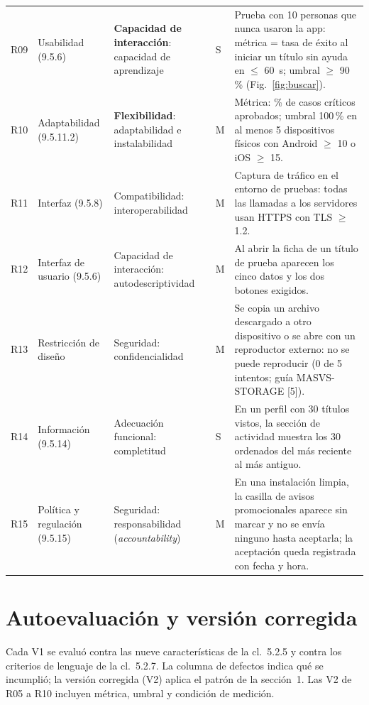 \documentclass[11pt,a4paper]{article}
\newcommand{\cl}[1]{cl.~#1}
\begin{document}
\begin{longtable}{@{}p{0.9cm}p{2.2cm}p{3.1cm}p{0.8cm}p{7.6cm}@{}}
R09 & Usabilidad (9.5.6) & \textbf{Capacidad de interacci\'on}: capacidad de aprendizaje & S & Prueba con 10 personas que nunca usaron la app: m\'etrica = tasa de \'exito al iniciar un t\'itulo sin ayuda en $\le$ 60~s; umbral $\ge$ 90\,\% (Fig.~\ref{fig:buscar}).\\
R10 & Adaptabilidad (9.5.11.2) & \textbf{Flexibilidad}: adaptabilidad e instalabilidad & M & M\'etrica: \% de casos cr\'iticos aprobados; umbral 100\,\% en al menos 5 dispositivos f\'isicos con Android $\ge$ 10 o iOS $\ge$ 15.\\
\midrule
R11 & Interfaz (9.5.8) & Compatibilidad: interoperabilidad & M & Captura de tr\'afico en el entorno de pruebas: todas las llamadas a los servidores usan HTTPS con TLS $\ge$ 1.2.\\
R12 & Interfaz de usuario (9.5.6) & Capacidad de interacci\'on: autodescriptividad & M & Al abrir la ficha de un t\'itulo de prueba aparecen los cinco datos y los dos botones exigidos.\\
R13 & Restricci\'on de dise\~no & Seguridad: confidencialidad & M & Se copia un archivo descargado a otro dispositivo o se abre con un reproductor externo: no se puede reproducir (0 de 5 intentos; guía MASVS-STORAGE [5]).\\
R14 & Informaci\'on (9.5.14) & Adecuaci\'on funcional: completitud & S & En un perfil con 30 t\'itulos vistos, la secci\'on de actividad muestra los 30 ordenados del m\'as reciente al m\'as antiguo.\\
R15 & Pol\'itica y regulaci\'on (9.5.15) & Seguridad: responsabilidad (\emph{accountability}) & M & En una instalaci\'on limpia, la casilla de avisos promocionales aparece sin marcar y no se env\'ia ninguno hasta aceptarla; la aceptaci\'on queda registrada con fecha y hora.\\
\bottomrule
\end{longtable}

\section{Autoevaluaci\'on y versi\'on corregida}
Cada V1 se evalu\'o contra las nueve caracter\'isticas de la \cl{5.2.5} y contra los criterios de lenguaje de la \cl{5.2.7}. La columna de defectos indica qu\'e se incumpli\'o; la versi\'on corregida (V2) aplica el patr\'on de la secci\'on~1. Las V2 de R05 a R10 incluyen m\'etrica, umbral y condici\'on de medici\'on.
\end{document}
